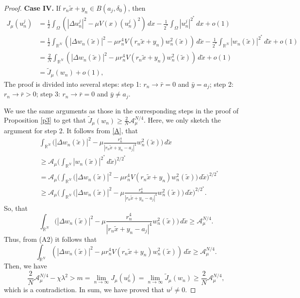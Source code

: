 \documentclass[reqno]{amsart}
\begin{document}
\begin{proof}
\noindent\textbf{Case IV.} If \(r_n\tilde{x}+y_n \in B(a_j, \delta_0)\), then
\begin{align*}
 J_{\mu}(u_n^j)&=\frac{1}{2}\int_{\Omega}(|\Delta u_n^j|^2-\mu V(x)(u_n^j)^2)\,dx-\frac{1}{2^*} \int_{\Omega} |u_n^j|^{2^*}\,dx+o(1)\\
 &=\frac{1}{2}\int_{\mathbb{R}^N}\left( |\Delta w_n(\tilde{x})|^2-\mu r_n^4 V(r_n\tilde{x}+y_n)w_n^2(\tilde{x})\right)\,d\tilde{x}-\frac{1}{2^*}\int _{\mathbb{R}^N}|w_n(\tilde{x})|^{2^*}\,d\tilde{x}+o(1)\\
 &=\frac{2}{N}\int_{\mathbb{R}^N}\left( |\Delta w_n(\tilde{x})|^2-\mu r_n^4 V(r_n\tilde{x}+y_n)w_n^2(\tilde{x})\right)\,d\tilde{x}+o(1)\\
 &=\tilde{J}_\mu(w_n)+o(1),
\end{align*}
The proof is divided into several steps:
step 1: \(r_n\to \bar{r}=0\) and \(\bar {y}=a_j\);
step 2: \(r_n\to \bar{r}>0\);
step 3: \(r_n\to \bar{r}=0\) and \(\bar {y}\neq a_j\).

We use the same arguments as those in the corresponding steps in the proof of 
Proposition \ref{p3} to get that 
$\tilde{J}_\mu(w_n)\geq \frac{2}{N}\mathcal{A}_{\mu}^{N/4}$.
Here, we only sketch the argument for step 2. 
It follows from \eqref{A}, that
\begin{align*}
 &\int_{\mathbb{R}^N}\Big( |\Delta w_n(\tilde{x})|^2-\mu \frac{r_n^4}{\left| 
  r_{n}\tilde{x}+y_n-a_j\right| ^4}w_n^2(\tilde{x})\Big)\,d\tilde{x}\\
 &\geq \mathcal{A}_{\mu} \Big( \int _{\mathbb{R}^N}|w_n(\tilde{x})|^{2^*}\,d\tilde{x}
  \Big) ^{2/2^*}\\
 &=\mathcal{A}_{\mu} \Big(\int_{\mathbb{R}^N} 
  \Big( |\Delta w_n(\tilde{x})|^2-\mu r_n^4 V(r_n\tilde{x}+y_n)w_n^2(\tilde{x})\Big) 
  \,d\tilde{x}\Big)^{2/2^*}\\
 &\geq \mathcal{A}_{\mu} \Big(\int_{\mathbb{R}^N}
 \Big( |\Delta w_n(\tilde{x})|^2-\mu \frac{r_n^4}{\left| r_{n}\tilde{x}
  +y_n-a_j\right| ^4}w_n^2(\tilde{x})\Big)\, d\tilde{x}\Big)^{2/2^*}. 
\end{align*}
So, that
\[
 \int_{\mathbb{R}^N}\Big( |\Delta w_n(\tilde{x})|^2-\mu \frac{r_n^4}
 {\left| r_{n}\tilde{x}+y_n-a_j\right| ^4}w_n^2(\tilde{x})\Big)\,d\tilde{x}
 \geq \mathcal{A}_{\mu}^{N/4}.
\]
Thus, from (A2) it follows that
\[
 \int_{\mathbb{R}^N}\left( |\Delta w_n(\tilde{x})|^2-\mu r_n^4 V(r_n\tilde{x}+y_n)w_n^2(\tilde{x})\right)\, d\tilde{x}
 \geq \mathcal{A}_{\mu}^{N/4}.
\]
Then, we have
 \[
 \frac{2}{N}\mathcal{A}_{\mu}^{N/4}-\chi \lambda^2> m
 =\lim_{n\to \infty}J_\mu (u_n^j)=\lim_{n\to \infty}\tilde{J}_\mu(w_n)
 \geq \frac{2}{N}\mathcal{A}_{\mu}^{N/4},
 \]
 which is a contradiction. In sum, we have proved that \(u^j\neq 0\).
 

\end{proof}
\end{document}
